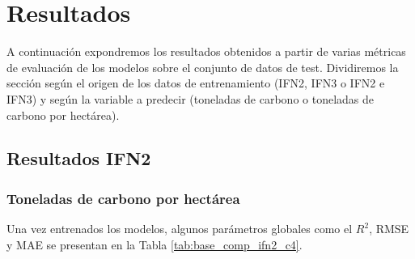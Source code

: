 \section{Resultados}
\label{sec:resultados}


A continuación expondremos los resultados obtenidos a partir de varias métricas de evaluación de los modelos sobre el conjunto de datos de test. Dividiremos la sección según el origen de los datos de entrenamiento (IFN2, IFN3 o IFN2 e IFN3) y según la variable a predecir (toneladas de carbono o toneladas de carbono por hectárea).

\subsection{Resultados IFN2}

\subsubsection{Toneladas de carbono por hectárea}


Una vez entrenados los modelos, algunos parámetros globales como el $R^2$, RMSE y MAE se presentan en la Tabla \ref{tab:base_comp_ifn2_c4}.

